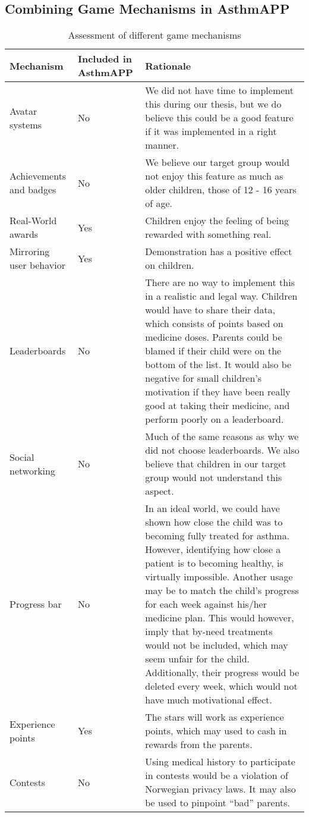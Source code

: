 \subsection{Combining Game Mechanisms in AsthmAPP}
\begin{table}[H]
\begin{tabular}{| p{2.5cm} | p{2.1cm} | p{9.5cm} | }
	\hline
	\textbf{Mechanism} & \textbf{Included in AsthmAPP} & \textbf{Rationale} \\
	\hline
	Avatar systems & No & We did not have time to implement this during our thesis, but we do believe this could be a good feature if it was implemented in a right manner.    
	 \\
	\hline
	Achievements and badges & No & We believe our target group would not enjoy this feature as much as older children, those of 12 - 16 years of age.  \\
	\hline 
	Real-World awards & Yes & Children enjoy the feeling of being rewarded with something real.
	 \\
	\hline
	Mirroring user behavior & Yes & Demonstration has a positive effect on children.
	\\
	\hline
	Leaderboards & No & There are no way to implement this in a realistic and legal way. Children would have to share their data, which consists of points based on medicine doses. Parents could be blamed if their child were on the bottom of the list. It would also be negative for small children's motivation if they have been really good at taking their medicine, and perform poorly on a leaderboard. 
	\\
	\hline
	Social networking & No & Much of the same reasons as why we did not choose leaderboards. We also believe that children in our target group would not understand this aspect.  
	\\
	\hline
	Progress bar & No & In an ideal world, we could have shown how close the child was to becoming fully treated for asthma. However, identifying how close a patient is to becoming healthy, is virtually impossible. Another usage may be to match the child's progress for each week against his/her medicine plan. This would however, imply that by-need treatments would not be included, which may seem unfair for the child. Additionally, their progress would be deleted every week, which would not have much motivational effect.  
	\\
	\hline
	Experience points & Yes & The stars will work as experience points, which may used to cash in rewards from the parents. 
	\\
	\hline
	Contests & No & Using medical history to participate in contests would be a violation of Norwegian privacy laws. It may also be used to pinpoint ``bad'' parents.      
	\\
	\hline
\end{tabular}
\caption{Assessment of different game mechanisms}
\label{tab:game-mech-in-astmapp}
\end{table}

